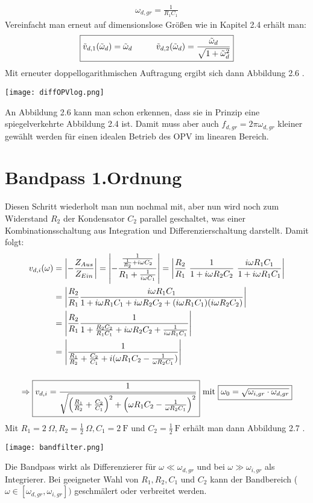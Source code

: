 \begin{gather}
    \boxed{\omega_{d,gr}=\frac{1}{R_1 C_1}}
\end{gather}
Vereinfacht man erneut auf dimensionslose Größen wie in Kapitel 2.4 erhält man:
\begin{gather}
    \boxed{\tilde{v}_{d,1}(\tilde{\omega}_d) = \tilde{\omega}_d \hspace*{1cm} \tilde{v}_{d,2}(\tilde{\omega}_d) =\frac{\tilde{\omega}_d}{\sqrt{1+\tilde{\omega}_d^2}}}
\end{gather}
Mit erneuter doppellogarithmischen Auftragung ergibt sich dann Abbildung 2.6 .
\begin{center}
    \texttt{[image: diffOPVlog.png]}
\end{center}
An Abbildung 2.6 kann man schon erkennen, dass sie in Prinzip eine spiegelverkehrte Abbildung 2.4 ist. Damit muss aber auch $f_{d,gr}=2\pi\omega_{d,gr}$ kleiner gewählt werden für einen idealen Betrieb des OPV im linearen Bereich.
\newpage
\section*{Bandpass 1.Ordnung}
Diesen Schritt wiederholt man nun nochmal mit, aber nun wird noch zum Widerstand $R_2$ der Kondensator $C_2$ parallel geschaltet, was einer Kombinationsschaltung aus Integration und Differenzierschaltung darstellt. Damit folgt: %
\begin{gather}
    \begin{aligned}
        v_{d,i}(\omega) &= \abs{-\frac{Z_{Aus}}{Z_{Ein}}} = \abs{-\frac{\frac{1}{\frac{1}{R_2}+ i\omega C_2}}{R_1 + \frac{1}{i\omega C_1}}} = \abs{\frac{R_2}{R_1}~\frac{1}{1+i\omega R_2C_2}~\frac{i\omega R_1 C_1}{1+i\omega R_1C_1}}\\
        &=\abs{\frac{R_2}{R_1}\frac{i\omega R_1C_1}{1 + i\omega R_1C_1 + i\omega R_2C_2 + (i\omega R_1C_1)(i\omega R_2C_2)}}\\
        &=\abs{\frac{R_2}{R_1}\frac{1}{1 + \frac{R_2C_2}{R_1C_1} + i\omega R_2C_2 + \frac{1}{i\omega R_1C_1}}}\\
        &=\abs{\frac{1}{\frac{R_1}{R_2}+\frac{C_2}{C_1}+i(\omega R_1C_2 - \frac{1}{\omega R_2C_1})}}
    \end{aligned}\\[0.5cm]
    \Rightarrow \boxed{v_{d,i}=\frac{1}{\sqrt{\left(\frac{R_1}{R_2}+\frac{C_2}{C_1}\right)^2+\left(\omega R_1C_2 - \frac{1}{\omega R_2C_1}\right)^2}}}~\text{mit}~\boxed{\omega_0 = \sqrt{\omega_{i,gr}\cdot \omega_{d,gr}}}
\end{gather}
Mit $R_1 = 2~\Omega, R_2 = \frac{1}{2}~\Omega, C_1 = 2~\text{F}$ und $C_2 = \frac{1}{2}~\text{F}$ erhält man dann Abbildung 2.7 .
\begin{center}
    \texttt{[image: bandfilter.png]}
\end{center}
Die Bandpass wirkt als Differenzierer für $\omega \ll \omega_{d,gr}$ und bei $\omega \gg \omega_{i,gr}$ als Integrierer. Bei geeigneter Wahl von $R_1, R_2, C_1$ und $C_2$ kann der Bandbereich ($\omega \in [\omega_{d,gr},\omega_{i,gr}])$ geschmälert oder verbreitet werden. %